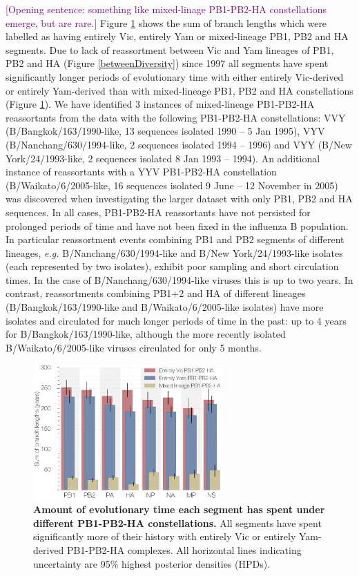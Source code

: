 \documentclass[11pt,oneside,letterpaper]{article}
\def\tbc#1{\textcolor{purple}{[#1]}}
\begin{document}
\tbc{Opening sentence: something like mixed-linage PB1-PB2-HA constellations emerge, but are rare.}
Figure \ref{stateTime} shows the sum of branch lengths which were labelled as having entirely Vic, entirely Yam or mixed-lineage PB1, PB2 and HA segments.
Due to lack of reassortment between Vic and Yam lineages of PB1, PB2 and HA (Figure \ref{betweenDiversity}) since 1997 all segments have spent significantly longer periods of evolutionary time with either entirely Vic-derived or entirely Yam-derived than with mixed-lineage PB1, PB2 and HA constellations (Figure \ref{stateTime}).
We have identified 3 instances of mixed-lineage PB1-PB2-HA reassortants from the data with the following PB1-PB2-HA constellations: VVY (B/Bangkok/163/1990-like, 13 sequences isolated 1990 -- 5 Jan 1995), VYV (B/Nanchang/630/1994-like, 2 sequences isolated 1994 -- 1996) and VYY (B/New York/24/1993-like, 2 sequences isolated 8 Jan 1993 -- 1994).
An additional instance of reassortants with a YYV PB1-PB2-HA constellation (B/Waikato/6/2005-like, 16 sequences isolated 9 June -- 12 November in 2005) was discovered when investigating the larger dataset with only PB1, PB2 and HA sequences.
In all cases, PB1-PB2-HA reassortants have not persisted for prolonged periods of time and have not been fixed in the influenza B population.
In particular reassortment events combining PB1 and PB2 segments of different lineages, \textit{e.g.} B/Nanchang/630/1994-like and B/New York/24/1993-like isolates (each represented by two isolates), exhibit poor sampling and short circulation times.
In the case of B/Nanchang/630/1994-like viruses this is up to two years.
In contrast, reassortments combining PB1+2 and HA of different lineages (B/Bangkok/163/1990-like and B/Waikato/6/2005-like isolates) have more isolates and circulated for much longer periods of time in the past: up to 4 years for B/Bangkok/163/1990-like, although the more recently isolated B/Waikato/6/2005-like viruses circulated for only 5 months.

\begin{figure}[h]
	\centering		
	\includegraphics[width=0.65\textwidth]{figures/InfB_stateTime.png}
	\caption{\textbf{Amount of evolutionary time each segment has spent under different PB1-PB2-HA constellations.}
All segments have spent significantly more of their history with entirely Vic or entirely Yam-derived PB1-PB2-HA complexes.
All horizontal lines indicating uncertainty are 95\% highest posterior densities (HPDs).}
	\label{stateTime}
\end{figure}
\end{document}
